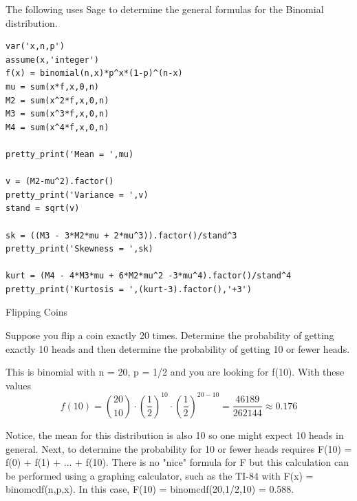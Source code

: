 \documentclass[10pt,]{book}
\theoremstyle{plain}
\theoremstyle{definition}
\theoremstyle{definition}
\theoremstyle{definition}
\numberwithin{equation}{section}
\begin{document}
\par
The following uses Sage to determine the general formulas for the Binomial distribution.
%
\begin{lstlisting}[style=sageinput]
var('x,n,p')
assume(x,'integer')
f(x) = binomial(n,x)*p^x*(1-p)^(n-x)
mu = sum(x*f,x,0,n)
M2 = sum(x^2*f,x,0,n)
M3 = sum(x^3*f,x,0,n)
M4 = sum(x^4*f,x,0,n)

pretty_print('Mean = ',mu)

v = (M2-mu^2).factor()
pretty_print('Variance = ',v)
stand = sqrt(v)

sk = ((M3 - 3*M2*mu + 2*mu^3)).factor()/stand^3
pretty_print('Skewness = ',sk)

kurt = (M4 - 4*M3*mu + 6*M2*mu^2 -3*mu^4).factor()/stand^4
pretty_print('Kurtosis = ',(kurt-3).factor(),'+3')
\end{lstlisting}
\par
Flipping Coins%
\par
Suppose you flip a coin exactly 20 times. Determine the probability of getting exactly 10 heads and then determine the probability of getting 10 or fewer heads.
%

This is binomial with n = 20, p = 1/2 and you are looking for f(10). With these values
\begin{equation*}f(10) = \binom{20}{10} \cdot \left ( \frac{1}{2} \right )^{10} \cdot \left ( \frac{1}{2} \right 	)^{20-10} = \frac{46189}{262144} \approx 0.176\end{equation*}
%
\par

Notice, the mean for this distribution is also 10 so one might expect 10 heads in general.  Next, to determine the probability for 10 or fewer heads requires F(10) = f(0) + f(1) + ... + f(10). There is no "nice" formula for F but this calculation can be performed using a graphing calculator, such as the TI-84 with F(x) = binomcdf(n,p,x). In this case, F(10) = binomcdf(20,1/2,10) = 0.588.
%
\typeout{************************************************}
\typeout{************************************************}
\end{document}
